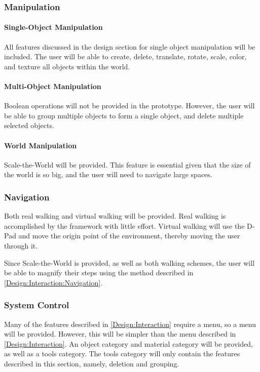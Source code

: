 \subsubsection{Manipulation}
\paragraph{Single-Object Manipulation}
All features discussed in the design section for single object manipulation will be included.
The user will be able to create, delete, translate, rotate, scale, color, and texture all objects within the world.

\paragraph{Multi-Object Manipulation}
Boolean operations will not be provided in the prototype.
However, the user will be able to group multiple objects to form a single object, and delete multiple selected objects.

\paragraph{World Manipulation}
Scale-the-World will be provided.
This feature is essential given that the size of the world is so big, and the user will need to navigate large spaces.

\subsubsection{Navigation}
Both real walking and virtual walking will be provided.
Real walking is accomplished by the framework with little effort.
Virtual walking will use the D-Pad and move the origin point of the environment, thereby moving the user through it.

Since Scale-the-World is provided, as well as both walking schemes, the user will be able to magnify their steps using the method described in \ref{Design:Interaction:Navigation}.

\subsubsection{System Control}
Many of the features described in \ref{Design:Interaction} require a menu, so a menu will be provided.
However, this will be simpler than the menu described in \ref{Design:Interaction}.
An object category and material category will be provided, as well as a tools category.
The tools category will only contain the features described in this section, namely, deletion and grouping.

